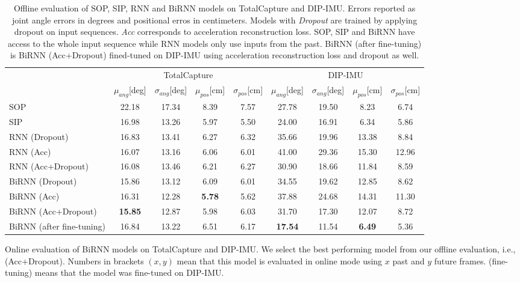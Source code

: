 \documentclass[acmtog]{acmart}
\begin{document}
\begin{table*}[ht]
	\caption{Offline evaluation of SOP, SIP, RNN and BiRNN models on TotalCapture \cite{trumble2017total} and DIP-IMU. Errors reported as joint angle errors in degrees and positional erros in centimeters. Models with \textit{Dropout} are trained by applying dropout on input sequences. \textit{Acc} corresponds to acceleration reconstruction loss. SOP, SIP and BiRNN have access to the whole input sequence while RNN models only use inputs from the past. BiRNN (after fine-tuning) is BiRNN (Acc+Dropout) fined-tuned on DIP-IMU using acceleration reconstruction loss and dropout as well.}

	\begin{tabular}{l | c c c c | c c c c}
		\hline
		& \multicolumn{4}{c}{TotalCapture} & \multicolumn{4}{|c}{DIP-IMU} \\       
		& $\mu_{ang}$[deg] & $\sigma_{ang}$[deg] & $\mu_{pos}$[cm] & $\sigma_{pos}$[cm] & $\mu_{ang}$[deg] & $\sigma_{ang}$[deg] & $\mu_{pos}$[cm] & $\sigma_{pos}$[cm] \\
		\hline
		SOP & 22.18 & 17.34 & 8.39 & 7.57 & 27.78 & 19.50 & 8.23 & 6.74\\
		SIP & 16.98 & 13.26 & 5.97 & 5.50 & 24.00 & 16.91 & 6.34 & 5.86\\
		\hline
		RNN (Dropout) & 16.83 & 13.41 & 6.27 & 6.32 & 35.66 & 19.96 & 13.38 & 8.84 \\
		RNN (Acc) & 16.07 & 13.16 & 6.06 & 6.01 & 41.00 & 29.36 & 15.30 & 12.96 \\
		RNN (Acc+Dropout) & 16.08 & 13.46 & 6.21 & 6.27 & 30.90 & 18.66 & 11.84 & 8.59\\
		BiRNN (Dropout) & 15.86 & 13.12 & 6.09 & 6.01 & 34.55 & 19.62 & 12.85 & 8.62\\
		BiRNN (Acc) & 16.31 & 12.28 & \textbf{5.78} & 5.62 & 37.88 & 24.68 & 14.31 & 11.30 \\
		BiRNN (Acc+Dropout) & \textbf{15.85} & 12.87 & 5.98 & 6.03 & 31.70 & 17.30 & 12.07 & 8.72 \\
		BiRNN (after fine-tuning)& 16.84 & 13.22 & 6.51 & 6.17 & \textbf{17.54} & 11.54 & \textbf{6.49} & 5.36 \\
		\hline
	\end{tabular}
	\label{tab:experiment_results_offline}
\end{table*}\begin{table*}[ht]
	\caption{Online evaluation of BiRNN models on TotalCapture \cite{trumble2017total} and DIP-IMU. We select the best performing model from our offline evaluation, i.e., (Acc+Dropout). Numbers in brackets $(x, y)$ mean that this model is evaluated in online mode using $x$ past and $y$ future frames. (fine-tuning) means that the model was fine-tuned on DIP-IMU.}

\end{table*}
\end{document}
